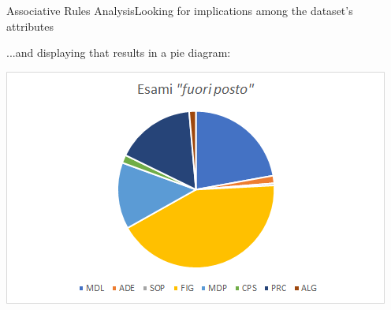 \begin{frame}{Associative Rules Analysis}{Looking for implications among the dataset's attributes}

	...and displaying that results in a pie diagram:

    \vspace{0.3cm}
    \begin{centering}
        \hspace*{1.0cm}\includegraphics[scale=0.50]{../seq/out_of_place.png}
    \end{centering}

\end{frame}